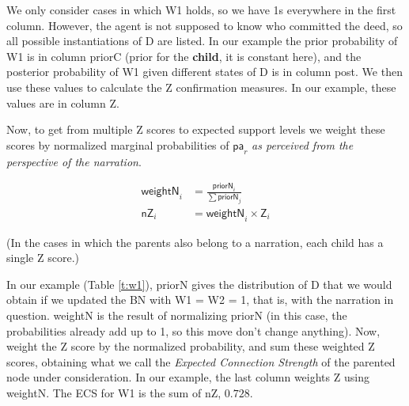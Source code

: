 \documentclass[10pt,]{scrartcl}
\newcommand{\s}[1]{\mbox{\textsf{#1}}}
\begin{document}
 We only consider cases in which \textsf{W1} holds, so we have 1s everywhere in the first column. However, the agent is not supposed to know who committed the deed, so all possible instantiations of \textsf{D} are listed.   In our example the prior probability of \s{W1} is in column \textsf{priorC} (prior for the \textbf{child}, it is constant here), and the posterior probability of \textsf{W1} given different states of \textsf{D} is in column \s{post}.  We then  use these values to calculate the \s{Z} confirmation measures. In our example, these values are in column \s{Z}. 
 
 
 Now, to get from multiple \s{Z} scores to expected support levels we weight these scores by normalized  marginal probabilities of \(\mathsf{pa}_r\) \emph{as perceived from the perspective of the narration}. 
 
 \begin{align*}
    \mathsf{weightN}_i & = \frac{\mathsf{priorN}_i}{\sum \mathsf{priorN}_j}\\
    \mathsf{nZ}_{i} & = \mathsf{weightN}_i \times \mathsf{Z}_i
 \end{align*}
 
 
 \noindent (In  the cases in which the parents also belong to a narration,  each child has a single \s{Z} score.) 

 




 In our example (Table \ref{t:w1}), \textsf{priorN} gives the distribution of \textsf{D} that we would obtain if we updated the BN with \textsf{W1} = \textsf{W2} = 1, that is, with the narration in question.  \textsf{weightN} is the result of normalizing \textsf{priorN} (in this case, the probabilities already add up to 1, so this move don't change anything). Now, weight the Z score by the normalized probability, and sum these weighted Z scores, obtaining what we call the \emph{Expected Connection Strength} of the parented node under consideration.   In our example, the last column weights \textsf{Z} using  \textsf{weightN}. The \textsf{ECS} for \textsf{W1} is the sum of \textsf{nZ}, $0.728$.
\end{document}
